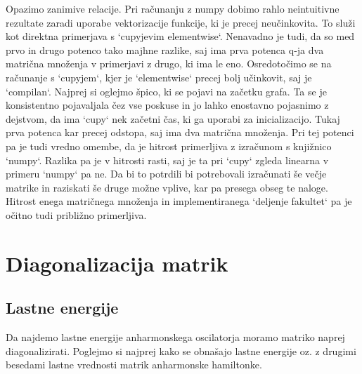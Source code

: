 \documentclass{article}
\begin{document}
Opazimo zanimive relacije. Pri računanju z numpy dobimo rahlo neintuitivne rezultate zaradi uporabe vektorizacije funkcije, ki je precej neučinkovita. To služi kot direktna primerjava s `cupyjevim elementwise`. Nenavadno je tudi, da so med prvo in drugo potenco tako majhne razlike, saj ima prva potenca q-ja dva matrična množenja v primerjavi z drugo, ki ima le eno. Osredotočimo se na računanje s `cupyjem`, kjer je `elementwise` precej bolj učinkovit, saj je `compilan`. Najprej si oglejmo špico, ki se pojavi na začetku grafa. Ta se je konsistentno pojavaljala čez vse poskuse in jo lahko enostavno pojasnimo z dejstvom, da ima `cupy` nek začetni čas, ki ga uporabi za inicializacijo. Tukaj prva potenca kar precej odstopa, saj ima dva matrična množenja. Pri tej potenci pa je tudi vredno omembe, da je hitrost primerljiva z izračunom s knjižnico `numpy`. Razlika pa je v hitrosti rasti, saj je ta pri `cupy` zgleda linearna v primeru `numpy` pa ne. Da bi to potrdili bi potrebovali izračunati še večje matrike in raziskati še druge možne vplive, kar pa presega obseg te naloge. Hitrost enega matričnega množenja in implementiranega `deljenje fakultet` pa je očitno tudi približno primerljiva. 
\newpage
\section{Diagonalizacija matrik}
\subsection{Lastne energije}
Da najdemo lastne energije anharmonskega oscilatorja moramo matriko naprej diagonalizirati. Poglejmo si najprej kako se obnašajo lastne energije oz. z drugimi besedami lastne vrednosti matrik anharmonske hamiltonke. 
\end{document}
